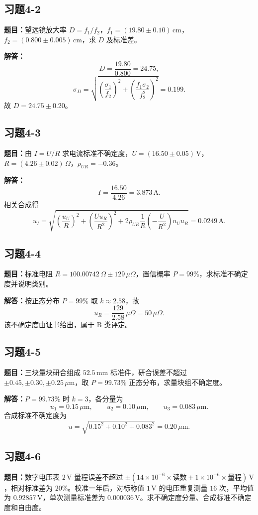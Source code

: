 \documentclass[UTF8,zihao=-4]{ctexart}
\newcommand{\problem}[1]{\subsection*{#1}}
\newcommand{\timu}{\noindent\textbf{题目：}}
\newcommand{\jieda}{\noindent\textbf{解答：}}
\begin{document}
{\problem{习题4-2}
\timu 望远镜放大率 $D=f_1/f_2$，$f_1=(19.80\pm0.10)\,\mathrm{cm}$，$f_2=(0.800\pm0.005)\,\mathrm{cm}$，求 $D$ 及标准差。

\jieda
\begin{equation*}
    D=\frac{19.80}{0.800}=24.75,
\end{equation*}
\begin{equation*}
    \sigma_D=\sqrt{\left(\frac{\sigma_1}{f_2}\right)^2+
    \left(\frac{f_1\sigma_2}{f_2^2}\right)^2}=0.199.
\end{equation*}
故 $D=24.75\pm0.20$。

\problem{习题4-3}
\timu 由 $I=U/R$ 求电流标准不确定度，$U=(16.50\pm0.05)\,\mathrm{V}$，$R=(4.26\pm0.02)\,\Omega$，$\rho_{UR}=-0.36$。

\jieda
\begin{equation*}
    I=\frac{16.50}{4.26}=3.873\,\mathrm{A}.
\end{equation*}
相关合成得
\begin{equation*}
    u_I=\sqrt{\left(\frac{u_U}{R}\right)^2+
    \left(\frac{Uu_R}{R^2}\right)^2+2\rho_{UR}\frac{1}{R}\left(-\frac{U}{R^2}\right)u_Uu_R}=0.0249\,\mathrm{A}.
\end{equation*}

\problem{习题4-4}
\timu 标准电阻 $R=100.00742\,\Omega\pm129\,\mu\Omega$，置信概率 $P=99\%$，求标准不确定度并说明类别。

\jieda 按正态分布 $P=99\%$ 取 $k\approx2.58$，故
\begin{equation*}
    u_R=\frac{129}{2.58}\,\mu\Omega=50\,\mu\Omega.
\end{equation*}
该不确定度由证书给出，属于 B 类评定。

\problem{习题4-5}
\timu 三块量块研合组成 $52.5\,\mathrm{mm}$ 标准件，研合误差不超过 $\pm0.45,\pm0.30,\pm0.25\,\mu\mathrm{m}$，取 $P=99.73\%$ 正态分布，求量块组不确定度。

\jieda $P=99.73\%$ 时 $k=3$，各分量为
\begin{equation*}
    u_1=0.15\,\mu\mathrm{m},\qquad u_2=0.10\,\mu\mathrm{m},\qquad u_3=0.083\,\mu\mathrm{m}.
\end{equation*}
合成标准不确定度为
\begin{equation*}
    u=\sqrt{0.15^2+0.10^2+0.083^2}=0.20\,\mu\mathrm{m}.
\end{equation*}

\problem{习题4-6}
\timu 数字电压表 $2\,\mathrm{V}$ 量程误差不超过 $\pm(14\times10^{-6}\times\text{读数}+1\times10^{-6}\times\text{量程})\,\mathrm{V}$，相对标准差为 $20\%$。校准一年后，对标称值 $1\,\mathrm{V}$ 的电压重复测量 $16$ 次，平均值为 $0.92857\,\mathrm{V}$，单次测量标准差为 $0.000036\,\mathrm{V}$。求不确定度分量、合成标准不确定度和自由度。

}
\end{document}
